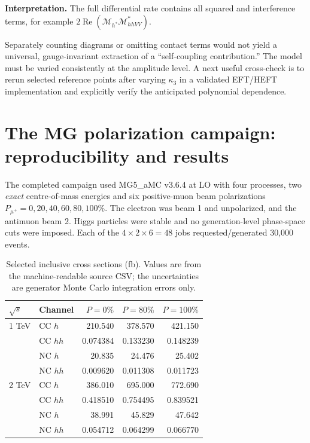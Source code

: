 \documentclass[12pt,a4paper]{article}
\newcommand{\newnote}{\clearpage}
\begin{document}
\textbf{Interpretation.} 
The full differential rate contains all squared and interference terms, for example $2\operatorname{Re}(\mathcal M_{h^*}\mathcal M_{hhVV}^*)$.\par Separately counting diagrams or omitting contact terms would not yield a universal, gauge-invariant extraction of a ``self-coupling contribution.'' The model must be varied consistently at the amplitude level. A next useful cross-check is to rerun selected reference points after varying $\kappa_3$ in a validated EFT/HEFT implementation and explicitly verify the anticipated polynomial dependence.




\newnote

\section{The MG polarization campaign: reproducibility and results}


The completed campaign used MG5\_aMC v3.6.4 at LO with four processes, two \emph{exact} centre-of-mass energies and six positive-muon beam polarizations $P_{\mu^+}=0,20,40,60,80,100\%$. The electron was beam 1 and unpolarized, and the antimuon beam 2. Higgs particles were stable and no generation-level phase-space cuts were imposed. Each of the $4\times2\times6=48$ jobs requested/generated 30,000 events. 

\begin{table}[H]
\centering\small
\caption{Selected inclusive cross sections (fb). Values are from the machine-readable source CSV; the uncertainties are generator Monte Carlo integration errors only.}
\begin{tabular}{@{}llrrr@{}}\toprule
$\sqrt{s}$ & Channel & $P=0\%$ & $P=80\%$ & $P=100\%$\\\midrule
1 TeV & CC $h$ & 210.540 & 378.570 & 421.150\\
 & CC $hh$ & 0.074384 & 0.133230 & 0.148239\\
 & NC $h$ & 20.835 & 24.476 & 25.402\\
 & NC $hh$ & 0.009620 & 0.011308 & 0.011723\\\midrule
2 TeV & CC $h$ & 386.010 & 695.000 & 772.690\\
 & CC $hh$ & 0.418510 & 0.754495 & 0.839521\\
 & NC $h$ & 38.991 & 45.829 & 47.642\\
 & NC $hh$ & 0.054712 & 0.064299 & 0.066770\\\bottomrule
\end{tabular}
\end{table}
\end{document}
